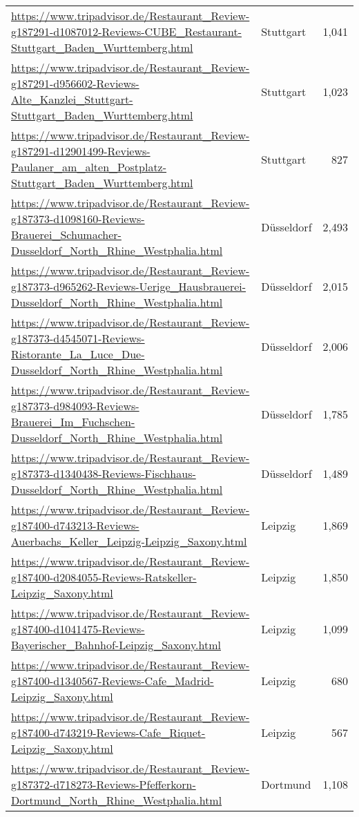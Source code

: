 \begin{table}[H]
{\begin{tabular}{llr}
\url{https://www.tripadvisor.de/Restaurant\_Review-g187291-d1087012-Reviews-CUBE\_Restaurant-Stuttgart\_Baden\_Wurttemberg.html} & Stuttgart & 1,041 \\ 
\url{https://www.tripadvisor.de/Restaurant\_Review-g187291-d956602-Reviews-Alte\_Kanzlei\_Stuttgart-Stuttgart\_Baden\_Wurttemberg.html} & Stuttgart & 1,023 \\ 
\url{https://www.tripadvisor.de/Restaurant\_Review-g187291-d12901499-Reviews-Paulaner\_am\_alten\_Postplatz-Stuttgart\_Baden\_Wurttemberg.html} & Stuttgart & 827 \\ 
\url{https://www.tripadvisor.de/Restaurant\_Review-g187373-d1098160-Reviews-Brauerei\_Schumacher-Dusseldorf\_North\_Rhine\_Westphalia.html} & Düsseldorf & 2,493 \\ 
\url{https://www.tripadvisor.de/Restaurant\_Review-g187373-d965262-Reviews-Uerige\_Hausbrauerei-Dusseldorf\_North\_Rhine\_Westphalia.html} & Düsseldorf & 2,015 \\ 
\url{https://www.tripadvisor.de/Restaurant\_Review-g187373-d4545071-Reviews-Ristorante\_La\_Luce\_Due-Dusseldorf\_North\_Rhine\_Westphalia.html} & Düsseldorf & 2,006 \\ 
\url{https://www.tripadvisor.de/Restaurant\_Review-g187373-d984093-Reviews-Brauerei\_Im\_Fuchschen-Dusseldorf\_North\_Rhine\_Westphalia.html} & Düsseldorf & 1,785 \\ 
\url{https://www.tripadvisor.de/Restaurant\_Review-g187373-d1340438-Reviews-Fischhaus-Dusseldorf\_North\_Rhine\_Westphalia.html} & Düsseldorf & 1,489 \\ 
\url{https://www.tripadvisor.de/Restaurant\_Review-g187400-d743213-Reviews-Auerbachs\_Keller\_Leipzig-Leipzig\_Saxony.html} & Leipzig & 1,869 \\ 
\url{https://www.tripadvisor.de/Restaurant\_Review-g187400-d2084055-Reviews-Ratskeller-Leipzig\_Saxony.html} & Leipzig & 1,850 \\ 
\url{https://www.tripadvisor.de/Restaurant\_Review-g187400-d1041475-Reviews-Bayerischer\_Bahnhof-Leipzig\_Saxony.html} & Leipzig & 1,099 \\ 
\url{https://www.tripadvisor.de/Restaurant\_Review-g187400-d1340567-Reviews-Cafe\_Madrid-Leipzig\_Saxony.html} & Leipzig & 680 \\ 
\url{https://www.tripadvisor.de/Restaurant\_Review-g187400-d743219-Reviews-Cafe\_Riquet-Leipzig\_Saxony.html} & Leipzig & 567 \\ 
\url{https://www.tripadvisor.de/Restaurant\_Review-g187372-d718273-Reviews-Pfefferkorn-Dortmund\_North\_Rhine\_Westphalia.html} & Dortmund & 1,108 \\ 

\end{tabular}}
\end{table}
